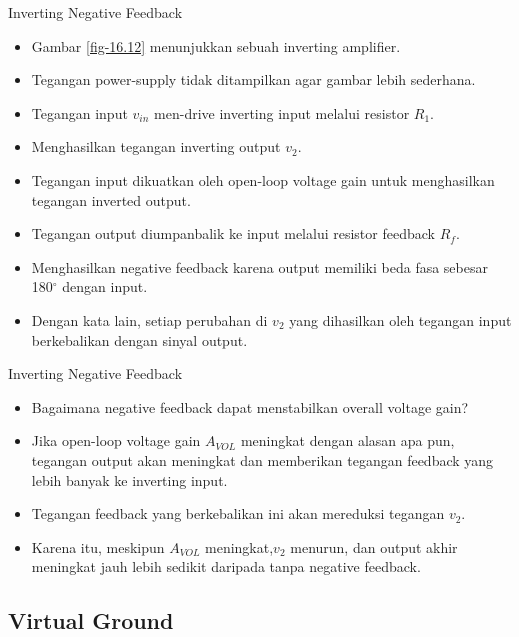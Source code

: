 \begin{frame}{Inverting Negative Feedback}
	\begin{itemize}
		\item Gambar \ref{fig-16.12} menunjukkan sebuah inverting amplifier.
		\item Tegangan power-supply tidak ditampilkan agar gambar lebih sederhana.
		\item Tegangan input $ v_{in} $ men-drive inverting input melalui resistor $ R_1 $.
		\item Menghasilkan tegangan inverting output $ v_2 $.
		\item Tegangan input dikuatkan oleh open-loop voltage gain untuk menghasilkan tegangan inverted output.
		\item Tegangan output diumpanbalik ke input melalui resistor feedback $ R_f $.
		\item Menghasilkan negative feedback karena output memiliki beda fasa sebesar 180$ ^\circ $ dengan input.
		\item Dengan kata lain, setiap perubahan di $ v_2 $ yang dihasilkan oleh tegangan input berkebalikan dengan sinyal output.
	\end{itemize}
\end{frame}

\begin{frame}{Inverting Negative Feedback}
	\begin{itemize}
		\item Bagaimana negative feedback dapat menstabilkan overall voltage gain?
		\item Jika open-loop voltage gain $ A_{VOL} $ meningkat dengan alasan apa pun, tegangan output akan meningkat dan memberikan tegangan feedback yang lebih banyak ke inverting input.
		\item Tegangan feedback yang berkebalikan ini akan mereduksi tegangan $ v_2 $.
		\item Karena itu, meskipun $ A_{VOL} $ meningkat,$ v_2 $ menurun, dan output akhir meningkat jauh lebih sedikit daripada tanpa negative feedback.
	\end{itemize}
\end{frame}

\subsection{Virtual Ground}

